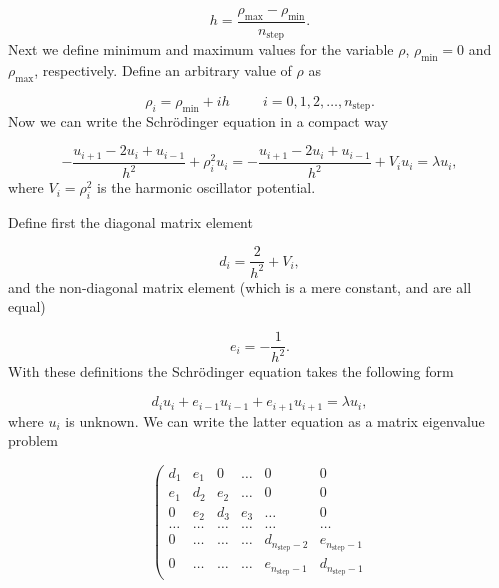 \documentclass{article}
\begin{document}
\begin{multicols}{2}
\begin{equation}
	  h=\frac{\rho_{\mathrm{max}}-\rho_{\mathrm{min}} }{n_{\mathrm{step}}}.
\end{equation}
Next we define minimum and maximum values for the variable $\rho$, $\rho_{\mathrm{min}}=0$  and $\rho_{\mathrm{max}}$, respectively. Define an arbitrary value of $\rho$ as 

\begin{equation}
	\rho_i= \rho_{\mathrm{min}} + ih \hspace{1cm} i=0,1,2,\dots , n_{\mathrm{step}}.
\end{equation}
Now we can write the Schr\"odinger equation in a compact way

\begin{equation*}
	-\frac{u_{i+1} -2u_i +u_{i-1}}{h^2}+\rho_i^2u_i=-\frac{u_{i+1} -2u_i +u_{i-1} }{h^2}+V_iu_i  = \lambda u_i,
\end{equation*}
where $V_i=\rho_i^2$ is the harmonic oscillator potential.

Define first the diagonal matrix element

\begin{equation}
   d_i=\frac{2}{h^2}+V_i,
\end{equation}
and the non-diagonal matrix element (which is a mere constant, and are all equal) 

\begin{equation}
   e_i=-\frac{1}{h^2}.
\end{equation}
With these definitions the Schr\"odinger equation takes the following form

\begin{equation}
d_iu_i+e_{i-1}u_{i-1}+e_{i+1}u_{i+1}  = \lambda u_i,
\end{equation}
where $u_i$ is unknown. We can write the latter equation as a matrix eigenvalue problem 

\begin{equation}\label{eq:sematrix}
    \left( \begin{array}{cccccc} 		
    d_1	& e_1	& 0		& \dots & 0	& 0 \\
	e_1 & d_2 	& e_2  	& \dots	& 0 & 0 \\
	0	& e_2 	& d_3 	& e_3	&\dots 	& 0\\
	\dots & \dots & \dots &\dots &\dots & \dots\\
	0 	& \dots & \dots &\dots &d_{n_{\mathrm{step}}-2} 		& e_{n_{\mathrm{step}}-1}\\
	0   & \dots & \dots  &\dots &e_{n_{\mathrm{step}}-1} 		& d_{n_{\mathrm{step}}-1}


\end{array}
\end{equation}
\end{multicols}
\end{document}
